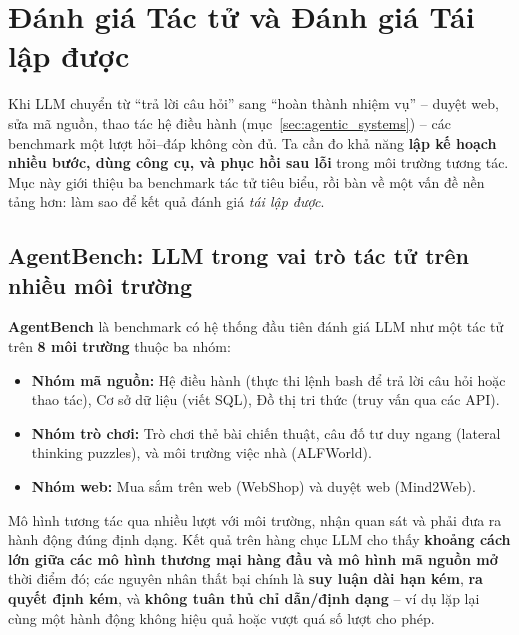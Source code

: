 
\section{Đánh giá Tác tử và Đánh giá Tái lập được \newtag}
\label{sec:agent_evaluation}

Khi LLM chuyển từ “trả lời câu hỏi” sang “hoàn thành nhiệm vụ” -- duyệt web, sửa mã nguồn, thao tác hệ điều hành (mục~\ref{sec:agentic_systems}) -- các benchmark một lượt hỏi--đáp không còn đủ. Ta cần đo khả năng \textbf{lập kế hoạch nhiều bước, dùng công cụ, và phục hồi sau lỗi} trong môi trường tương tác. Mục này giới thiệu ba benchmark tác tử tiêu biểu, rồi bàn về một vấn đề nền tảng hơn: làm sao để kết quả đánh giá \emph{tái lập được}.

\subsection{AgentBench: LLM trong vai trò tác tử trên nhiều môi trường}
\label{ssec:agentbench}
\textbf{AgentBench} \cite{liu2024agentbench} là benchmark có hệ thống đầu tiên đánh giá LLM như một tác tử trên \textbf{8 môi trường} thuộc ba nhóm:
\begin{itemize}
	\item \textbf{Nhóm mã nguồn:} Hệ điều hành (thực thi lệnh bash để trả lời câu hỏi hoặc thao tác), Cơ sở dữ liệu (viết SQL), Đồ thị tri thức (truy vấn qua các API).
	\item \textbf{Nhóm trò chơi:} Trò chơi thẻ bài chiến thuật, câu đố tư duy ngang (lateral thinking puzzles), và môi trường việc nhà (ALFWorld).
	\item \textbf{Nhóm web:} Mua sắm trên web (WebShop) và duyệt web (Mind2Web).
\end{itemize}
Mô hình tương tác qua nhiều lượt với môi trường, nhận quan sát và phải đưa ra hành động đúng định dạng. Kết quả trên hàng chục LLM cho thấy \textbf{khoảng cách lớn giữa các mô hình thương mại hàng đầu và mô hình mã nguồn mở} thời điểm đó; các nguyên nhân thất bại chính là \textbf{suy luận dài hạn kém}, \textbf{ra quyết định kém}, và \textbf{không tuân thủ chỉ dẫn/định dạng} -- ví dụ lặp lại cùng một hành động không hiệu quả hoặc vượt quá số lượt cho phép.

